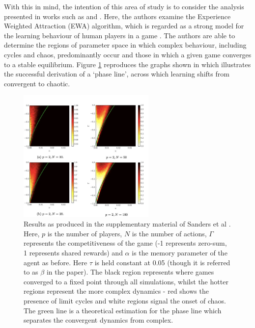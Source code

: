 \documentclass[.../main.tex]{subfiles}
\begin{document}
    With this in mind, the intention of this area of study is to consider the analysis presented in
    works such as \cite{Sanders2018} and \cite{Galla2011}. Here, the authors examine the
    Experience Weighted Attraction (EWA) algorithm, which is regarded as a strong model for the
    learning behaviour of human players in a game \cite{Camerer2009}. The authors are able to
    determine the regions of parameter space in which complex behaviour,
    including cycles and chaos, predominantly occur and those in which a given game converges to a
    stable equilibrium. Figure \ref{fig::GallaPredictions} reproduces the graphs shown in \cite{Sanders2018} which
    illustrates the successful derivation of a `phase line', across which learning shifts from
    convergent to chaotic.

    \begin{figure}[h]
        \centering
        \includegraphics[width=0.6\textwidth]{Figures/GallaPredictions}
        \caption{ \label{fig::GallaPredictions} Results as produced in the supplementary material
        of Sanders et al \cite{Sanders2018}. Here, $p$ is the number of players, $N$ is the number
        of actions, $\Gamma$ represents the competitiveness of the game (-1 represents zero-sum, 1
        represents shared rewards) and $\alpha$ is the memory parameter of the agent as before.
        Here $\tau$ is held constant at 0.05 (though it is referred to as $\beta$ in the paper).
        The black region represents where games converged to a fixed point through all simulations,
        whilst the hotter regions represent the more complex dynamics - red shows the presence of
        limit cycles and white regions signal the onset of chaos. The green line is a theoretical
        estimation for the phase line which separates the convergent dynamics from complex.}
    \end{figure}
\end{document}

